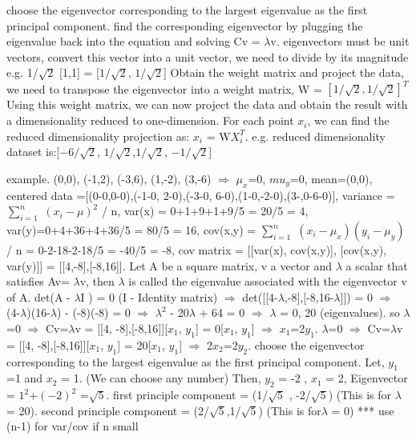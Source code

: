 \documentclass[10pt]{article}
\begin{document}
 choose the eigenvector corresponding to the largest eigenvalue as the first principal component. find the corresponding eigenvector by plugging the eigenvalue back into the equation and solving Cv = $\lambda$v. eigenvectors must be unit vectors, convert this vector into a unit vector, we need to divide by its magnitude e.g. 1/$\sqrt{2}$ [1,1] = [$1/\sqrt{2}$, $1/\sqrt{2}$]
\NEW    [STEP5] Obtain the weight matrix and project the data,  we need to transpose the eigenvector into a weight matrix, W = $[1/\sqrt{2}, 1/\sqrt{2}]^T$ Using this weight matrix, we can now project the data and obtain the result with a dimensionality reduced to one-dimension. For each point $x_i$, we can find the reduced dimensionality projection as: $x_i$ = W$X_i^T$. e.g. reduced dimensionality dataset is:[$-6/\sqrt{2}$, $1/\sqrt{2}$,$1/\sqrt{2}$, $-1/\sqrt{2}$]



\smallbreak
example. (0,0), (-1,2), (-3,6), (1,-2), (3,-6) $\Rightarrow$ $\mu_x$=0, $mu_y$=0, mean=(0,0), centered data =[(0-0,0-0),(-1-0, 2-0),(-3-0, 6-0),(1-0,-2-0),(3-,0-6-0)],  variance = $\sum_{i=1}^n$ $(x_i - \mu)^2$ / n, var(x) =  0+1+9+1+9/5 = 20/5 = 4, var(y)=0+4+36+4+36/5 = 80/5 = 16, cov(x,y) =  $\sum_{i=1}^n$ $(x_i - \mu_x)(y_i - \mu_y)$ / n = 0-2-18-2-18/5 = -40/5 = -8, cov matrix =  [[var(x), cov(x,y)], [cov(x,y), var(y)]] = [[4,-8],[-8,16]]. Let A be a square matrix,  v a vector and $\lambda$ a scalar that satisfies Av= $\lambda$v, then $\lambda$ is called the eigenvalue associated with the eigenvector v of A. det(A - $\lambda$I ) = 0 (I - Identity matrix) $\Rightarrow$ det([[4-$\lambda$,-8],[-8,16-$\lambda$]]) = 0 $\Rightarrow$ (4-$\lambda$)(16-$\lambda$) - (-8)(-8) = 0 $\Rightarrow$ $\lambda^2$ - 20$\lambda$ + 64 = 0 $\Rightarrow$ $\lambda$ = 0, 20 (eigenvalues). so $\lambda$=0 $\Rightarrow$ Cv=$\lambda$v = [[4, -8],[-8,16]][$x_1$, $y_1$] = 0[$x_1$, $y_1$] $\Rightarrow$ $x_1$=2$y_1$.  $\lambda$=0 $\Rightarrow$ Cv=$\lambda$v =  [[4, -8],[-8,16]][$x_1$, $y_1$] = 20[$x_1$, $y_1$] $\Rightarrow$ 2$x_2$=2$y_2$.  choose the eigenvector corresponding to the largest eigenvalue as the first principal component. Let, $y_1$=1 and $x_2$ = 1. (We can choose any number)
Then, $y_2$ = -2 , $x_1$ = 2, Eigenvector = $1^2$+$(-2)^2$ =$\sqrt{5}$. first principle component = (1/$\sqrt{5}$ , -2/$\sqrt{5}$) (This is for $\lambda$ = 20). second principle component = (2/$\sqrt{5}$,1/$\sqrt{5}$) (This is for$\lambda$ = 0) *** use (n-1) for var/cov if n small
\end{document}
